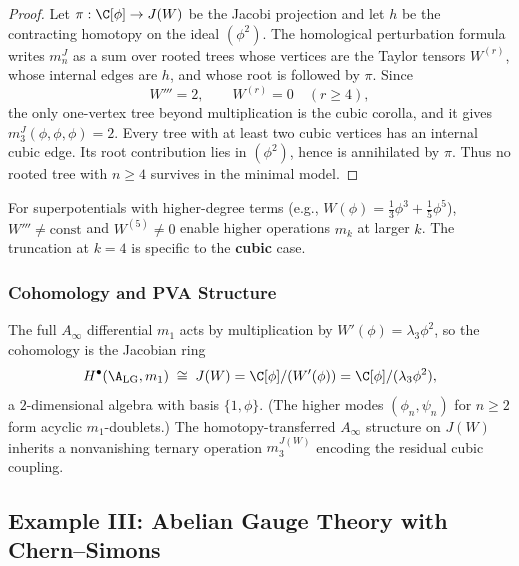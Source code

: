 \begin{proof}
Let \(\pi:\C[\phi]\to J(W)\) be the Jacobi projection and let \(h\)
be the contracting homotopy on the ideal \((\phi^2)\). The
homological perturbation formula writes \(m_n^J\) as a sum over rooted
trees whose vertices are the Taylor tensors \(W^{(r)}\), whose internal
edges are \(h\), and whose root is followed by \(\pi\). Since
\[
W'''=2,\qquad W^{(r)}=0\quad(r\geq4),
\]
the only one-vertex tree beyond multiplication is the cubic corolla,
and it gives \(m_3^J(\phi,\phi,\phi)=2\). Every tree with at least two
cubic vertices has an internal cubic edge. Its root contribution lies
in \((\phi^2)\), hence is annihilated by \(\pi\). Thus no rooted tree
with \(n\geq4\) survives in the minimal model.
\end{proof}

\begin{remark}
For superpotentials with higher-degree terms (e.g., $W(\phi) = \frac{1}{3}\phi^3 + \frac{1}{5}\phi^5$), $W''' \neq \text{const}$ and $W^{(5)} \neq 0$ enable higher operations $m_k$ at larger $k$. The truncation at $k=4$ is specific to the \textbf{cubic} case.
\end{remark}

\subsubsection{Cohomology and PVA Structure}

\begin{proposition}
The full $A_\infty$ differential $m_1$ acts by multiplication by $W'(\phi) = \lambda_3 \phi^2$, so
the cohomology is the Jacobian ring
\begin{equation}
H^\bullet(\A_{\text{LG}}, m_1) \;\cong\; J(W) = \C[\phi]/(W'(\phi)) = \C[\phi]/(\lambda_3 \phi^2),
\end{equation}
a $2$-dimensional algebra with basis $\{1, \phi\}$.
(The higher modes $(\phi_n, \psi_n)$ for $n \geq 2$ form acyclic $m_1$-doublets.)
The homotopy-transferred $A_\infty$ structure on $J(W)$ inherits a nonvanishing ternary
operation $m_3^{J(W)}$ encoding the residual cubic coupling.
\end{proposition}

\subsection{Example III: Abelian Gauge Theory with Chern--Simons}
\label{prop:abelian_CS_complete}

